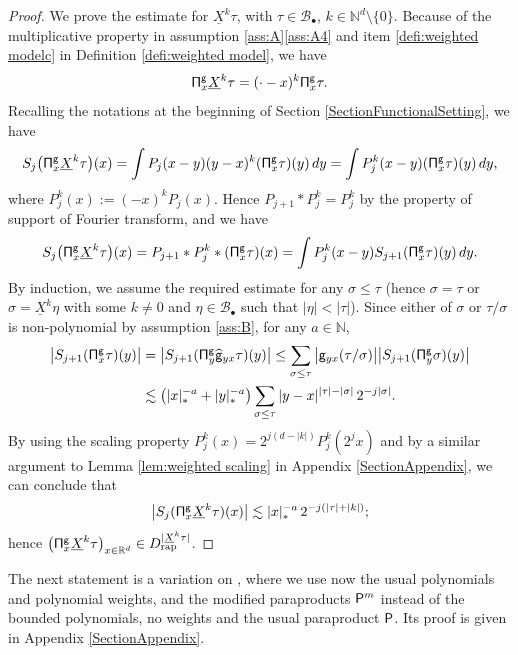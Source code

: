 \documentclass[JEP,XML,SOM,Unicode,published]{cedram}
\newcommand{\sbullet}{{\scriptscriptstyle\bullet}}
\theoremstyle{plain}
\theoremstyle{definition}
\newcommand{\rap}{\mathrm{rap}}
\newcommand{\sfg}{\mathsf{g}}
\newcommand{\bbN}{\mathbb{N}}
\newcommand{\bbR}{\mathbb{R}}
\newcommand{\mcB}{\mathcal{B}}
\begin{document}
\begin{proof}
We prove the estimate for $\underline{X}^k\tau$, with $\tau\in\mcB_\sbullet$, $k\in\bbN^d\setminus\{0\}$. Because of the multiplicative property in assumption \ref{ass:A}\eqref{ass:A4} and item \eqref{defi:weighted modelc} in Definition \ref{defi:weighted model}, we have
\[
{\sf\Pi}_x^{\sfg}\underline{X}^k\tau=(\cdot-x)^k{\sf\Pi}_x^{\sfg}\tau.
\]
Recalling the notations at the beginning of Section \ref{SectionFunctionalSetting}, we have
\begin{align*}
S_j\bigl({\sf\Pi}_x^{\sfg}\underline{X}^k\tau\bigr)(x)
= \int P_j(x-y)(y-x)^k({\sf\Pi}_x^{\sfg}\tau)(y)\,dy
= \int P_j^{k}(x-y)({\sf\Pi}_x^{\sfg}\tau)(y)\,dy,
\end{align*}
where $P_j^k(x):=(-x)^kP_j(x)$. Hence $P_{j+1}*P_j^k=P_j^k$ by the property of support of Fourier transform, and we have
\begin{align*}
S_j\bigl({\sf\Pi}_x^{\sfg}\underline{X}^k\tau\bigr)(x) = P_{j+1}*P_j^k*({\sf\Pi}_x^{\sfg}\tau)(x) = \int P_j^k(x-y)S_{j+1}({\sf\Pi}_x^{\sfg}\tau)(y)\,dy.
\end{align*}
By induction, we assume the required estimate for any $\sigma\le\tau$ (hence $\sigma=\tau$ or $\sigma=\underline{X}^k\eta$ with some $k\neq0$ and $\eta\in\mcB_\sbullet$ such that $|\eta|<|\tau|$).
Since either of $\sigma$ or $\tau/\sigma$ is non-polynomial by assumption \eqref{ass:B}, for any $a\in\bbN$,
\begin{align*}
\big|S_{j+1}({\sf\Pi}_x^{\sfg}\tau)(y)\big| &= \big|S_{j+1}({\sf\Pi}_y^{\sfg}\widehat{\sfg}_{yx}\tau)(y) \big|
\le\sum_{\sigma\le\tau} \big|\sfg_{yx}(\tau/\sigma)\big| \big|S_{j+1}({\sf\Pi}_y^{\sfg}\sigma)(y)\big| \\
&\lesssim \bigl(|x|_*^{-a}+|y|_*^{-a}\bigr) \sum_{\sigma\le\tau}|y-x|^{|\tau|-|\sigma|}\,2^{-j|\sigma|}.
\end{align*}
By using the scaling property $P_j^k(x)=2^{j(d-|k|)}P_j^k(2^jx)$ and by a similar argument to Lemma \ref{lem:weighted scaling} in Appendix \ref{SectionAppendix}, we can conclude that
\begin{align*}
\big|S_j({\sf\Pi}_x^{\sfg}\underline{X}^k\tau)(x)\big| \lesssim |x|_*^{-a}\,2^{-j(|\tau|+|k|)};
\end{align*}
hence $\bigl({\sf\Pi}_x^{\sfg}\underline{X}^k\tau\bigr)_{x\in\bbR^d}\in D_{\rap}^{|\underline{X}^k\tau|}$.
\end{proof}

The next statement is a variation on \cite[Prop.\,12]{BH}, where we use now the usual polynomials and polynomial weights, and the modified paraproducts ${\sf P}^m$ instead of the bounded polynomials, no weights and the usual paraproduct $\sf P$. Its proof is given in Appendix \ref{SectionAppendix}.
\end{document}
